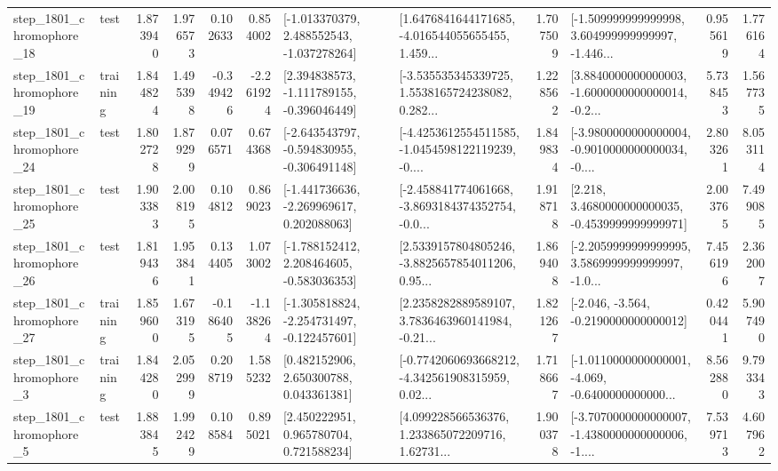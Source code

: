 \begin{tabular}{llrrrrllrlrr}
 step\_1801\_chromophore\_18 &      test &      1.873940 &    1.976573 &      0.102633 &  0.854002 &   [-1.013370379, 2.488552543, -1.037278264] &  [1.6476841644171685, -4.016544055655455, 1.459... &       1.707509 &  [-1.509999999999998, 3.604999999999997, -1.446... &            0.955619 &          1.776164 \\
 step\_1801\_chromophore\_19 &  training &      1.844824 &    1.495398 &     -0.349426 & -2.261924 &   [2.394838573, -1.111789155, -0.396046449] &  [-3.535535345339725, 1.5538165724238082, 0.282... &       1.228562 &  [3.8840000000000003, -1.6000000000000014, -0.2... &            5.738453 &          1.567735 \\
 step\_1801\_chromophore\_24 &      test &      1.802728 &    1.879299 &      0.076571 &  0.674368 &  [-2.643543797, -0.594830955, -0.306491148] &  [-4.4253612554511585, -1.0454598122119239, -0.... &       1.849834 &  [-3.9800000000000004, -0.9010000000000034, -0.... &            2.803261 &          8.053114 \\
 step\_1801\_chromophore\_25 &      test &      1.903383 &    2.008195 &      0.104812 &  0.869023 &   [-1.441736636, -2.269969617, 0.202088063] &  [-2.458841774061668, -3.8693184374352754, -0.0... &       1.918718 &   [2.218, 3.4680000000000035, -0.4539999999999971] &            2.003765 &          7.499085 \\
 step\_1801\_chromophore\_26 &      test &      1.819436 &    1.953841 &      0.134405 &  1.073002 &   [-1.788152412, 2.208464605, -0.583036353] &  [2.5339157804805246, -3.8825657854011206, 0.95... &       1.869408 &  [-2.2059999999999995, 3.5869999999999997, -1.0... &            7.456196 &          2.362007 \\
 step\_1801\_chromophore\_27 &  training &      1.859600 &    1.673195 &     -0.186405 & -1.138264 &  [-1.305818824, -2.254731497, -0.122457601] &  [2.2358282889589107, 3.7836463960141984, -0.21... &       1.821267 &              [-2.046, -3.564, -0.2190000000000012] &            0.420441 &          5.907490 \\
  step\_1801\_chromophore\_3 &  training &      1.844280 &    2.052999 &      0.208719 &  1.585232 &     [0.482152906, 2.650300788, 0.043361381] &  [-0.7742060693668212, -4.342561908315959, 0.02... &       1.718667 &  [-1.0110000000000001, -4.069, -0.6400000000000... &            8.562880 &          9.793343 \\
  step\_1801\_chromophore\_5 &      test &      1.883845 &    1.992429 &      0.108584 &  0.895021 &     [2.450222951, 0.965780704, 0.721588234] &  [4.099228566536376, 1.233865072209716, 1.62731... &       1.900378 &  [-3.7070000000000007, -1.4380000000000006, -1.... &            7.539713 &          4.607962 \\

\end{tabular}
